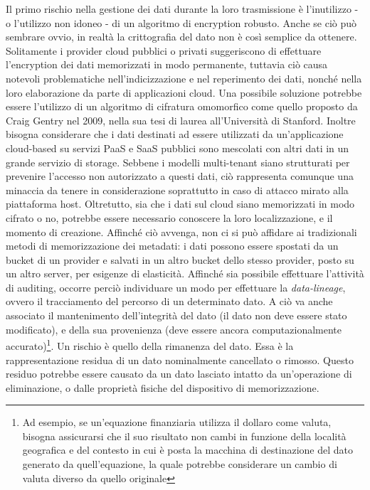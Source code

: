 Il primo rischio nella gestione dei dati durante la loro trasmissione è l'inutilizzo - o l'utilizzo non idoneo - di un algoritmo di encryption robusto. Anche se ciò può sembrare ovvio, in realtà la crittografia del dato non è così semplice da ottenere.
Solitamente i provider cloud pubblici o privati suggeriscono di effettuare l'encryption dei dati memorizzati in modo permanente, tuttavia ciò causa notevoli problematiche nell'indicizzazione e nel reperimento dei dati, nonché nella loro elaborazione da parte di applicazioni cloud.\cite{CloudSecurityBook}
Una possibile soluzione potrebbe essere l'utilizzo di un algoritmo di cifratura omomorfico come quello proposto da Craig Gentry nel 2009\cite{Gentry}, nella sua tesi di laurea all'Università di Stanford.
Inoltre bisogna considerare che i dati destinati ad essere utilizzati da un'applicazione cloud-based su servizi PaaS e SaaS pubblici sono mescolati con altri dati in un grande servizio di storage.
Sebbene i modelli multi-tenant siano strutturati per prevenire l'accesso non autorizzato a questi dati, ciò rappresenta comunque una minaccia da tenere in considerazione soprattutto in caso di attacco mirato alla piattaforma host.\cite{CloudSecurityBook}
Oltretutto, sia che i dati sul cloud siano memorizzati in modo cifrato o no, potrebbe essere necessario conoscere la loro localizzazione, e il momento di creazione. Affinché ciò avvenga, non ci si può affidare ai tradizionali metodi di memorizzazione dei metadati: i dati possono essere spostati da un bucket di un provider e salvati in un altro bucket dello stesso provider, posto su un altro server, per esigenze di elasticità.
Affinché sia possibile effettuare l'attività di auditing, occorre perciò individuare un modo per effettuare la \textit{data-lineage}, ovvero il tracciamento del percorso di un determinato dato.
A ciò va anche associato il mantenimento dell'integrità del dato (il dato non deve essere stato modificato), e della sua provenienza (deve essere ancora computazionalmente accurato)\footnote{Ad esempio, se un'equazione finanziaria utilizza il dollaro come valuta, bisogna assicurarsi che il suo risultato non cambi in funzione della località geografica e del contesto in cui è posta la macchina di destinazione del dato generato da quell'equazione, la quale potrebbe considerare un cambio di valuta diverso da quello originale}.\cite{CloudSecurityBook}
Un rischio è quello della rimanenza del dato. Essa è la rappresentazione residua di un dato nominalmente cancellato o rimosso. Questo residuo potrebbe essere causato da un dato lasciato intatto da un'operazione di eliminazione, o dalle proprietà fisiche del dispositivo di memorizzazione.
